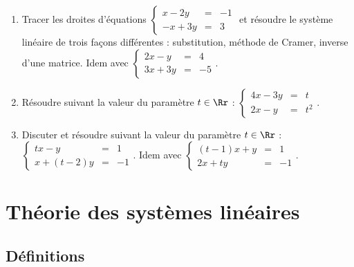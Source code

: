\documentclass[class=report,crop=false]{standalone}
\begin{document}

\begin{miniexercices}
\sauteligne
\begin{enumerate}
  \item Tracer les droites d'équations $\left\{\begin{array}{rcl}
x-2y  & = & -1\\
-x+3y & = & 3
\end{array}\right.$ et résoudre le système linéaire
 de trois façons différentes :
substitution, méthode de Cramer, inverse d'une matrice.
Idem avec $\left\{\begin{array}{rcl}
2x-y  & = & 4\\
3x+3y & = & -5
\end{array}\right..$

  \item Résoudre suivant la valeur du paramètre $t\in \Rr$ :
$\left\{\begin{array}{rcl}
4x-3y & = & t\\
2x-y  & = & t^2
\end{array}\right..$

  \item  Discuter et résoudre suivant la valeur du paramètre $t\in \Rr$ :
$\left\{\begin{array}{rcl}
tx-y     & = & 1\\
x+(t-2)y & = & -1
\end{array}\right..$
Idem avec $\left\{\begin{array}{rcl}
(t-1)x+y & = & 1\\
2x+ty    & = & -1
\end{array}\right..$

\end{enumerate}
\end{miniexercices}




\section{Théorie des systèmes linéaires}

\subsection{Définitions}
\end{document}
